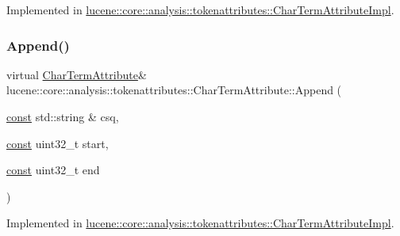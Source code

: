 Implemented in \mbox{\hyperlink{classlucene_1_1core_1_1analysis_1_1tokenattributes_1_1CharTermAttributeImpl_aaf6bf26fa572599e284845f67b444900}{lucene\+::core\+::analysis\+::tokenattributes\+::\+Char\+Term\+Attribute\+Impl}}.

\mbox{\label{classlucene_1_1core_1_1analysis_1_1tokenattributes_1_1CharTermAttribute_a1fc0d3eaff550a10e8fc17a5e7bb98bc}} 
\subsubsection{\texorpdfstring{Append()}{Append()}\hspace{0.1cm}{\footnotesize\ttfamily [2/4]}}
{\footnotesize\ttfamily virtual \mbox{\hyperlink{classlucene_1_1core_1_1analysis_1_1tokenattributes_1_1CharTermAttribute}{Char\+Term\+Attribute}}\& lucene\+::core\+::analysis\+::tokenattributes\+::\+Char\+Term\+Attribute\+::\+Append (\begin{DoxyParamCaption}\item[{\mbox{\hyperlink{ZlibCrc32_8h_a2c212835823e3c54a8ab6d95c652660e}{const}} std\+::string \&}]{csq,  }\item[{\mbox{\hyperlink{ZlibCrc32_8h_a2c212835823e3c54a8ab6d95c652660e}{const}} uint32\+\_\+t}]{start,  }\item[{\mbox{\hyperlink{ZlibCrc32_8h_a2c212835823e3c54a8ab6d95c652660e}{const}} uint32\+\_\+t}]{end }\end{DoxyParamCaption})\hspace{0.3cm}{\ttfamily [pure virtual]}}



Implemented in \mbox{\hyperlink{classlucene_1_1core_1_1analysis_1_1tokenattributes_1_1CharTermAttributeImpl_a5d2f89510d37dc11bbf22a77ac6bff83}{lucene\+::core\+::analysis\+::tokenattributes\+::\+Char\+Term\+Attribute\+Impl}}.

\mbox{\label{classlucene_1_1core_1_1analysis_1_1tokenattributes_1_1CharTermAttribute_a069f61e1cb30895a205e615c1d154148}} 
